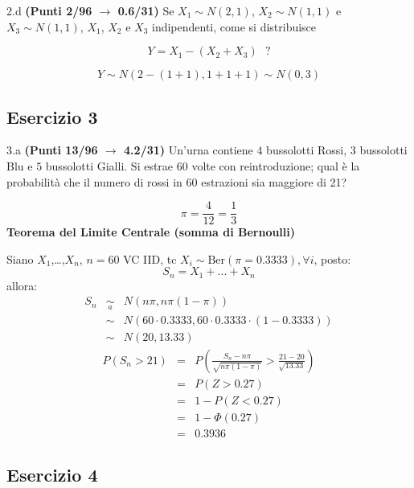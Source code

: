 \documentclass[
  11pt,
]{book}
\theoremstyle{mytheoremstyle}
\theoremstyle{mydefstyle}
\newenvironment{sol}
  {
  \begin{tcolorbox}[enhanced,breakable,arc=0.1mm,boxrule=1pt,colback=white,colframe=iblue,
  title=\bf \fontfamily{lmss}\selectfont \hspace{.5 cm} Soluzione,drop fuzzy shadow]

}{
\end{tcolorbox}
  }
\begin{document}
2.d \textbf{(Punti 2/96 \(\rightarrow\) 0.6/31)} Se \(X_1\sim N(2,1)\), \(X_2\sim N(1,1)\) e \(X_3\sim N(1,1)\),
\(X_1\), \(X_2\) e \(X_3\) indipendenti, come si distribuisce

\[
  Y=X_1-(X_2+X_3) ~~~?
\]

\begin{sol}
\[Y\sim N(2-(1+1),1+1+1)\sim N(0,3)\]

\end{sol}

\subsection{Esercizio 3}\label{esercizio-3-2}

3.a \textbf{(Punti 13/96 \(\rightarrow\) 4.2/31)} Un'urna contiene \(4\) bussolotti Rossi, \(3\) bussolotti Blu e \(5\) bussolotti Gialli. Si estrae 60 volte con reintroduzione; qual è la probabilità che il numero di rossi in 60 estrazioni sia maggiore di 21?

\begin{sol}
\[\pi=\frac 4{12}=\frac 13\]
\textbf{Teorema del Limite Centrale (somma di Bernoulli)}

Siano \(X_1\),\ldots,\(X_n\), \(n=60\) VC IID, tc \(X_i\sim\text{Ber}(\pi=0.3333)\)\(,\forall i\), posto:
\[
      S_n = X_1 + ... + X_n
      \]
allora:\begin{eqnarray*}
  S_n & \mathop{\sim}\limits_{a}& N(n\pi,n\pi(1-\pi)) \\
      &\sim & N(60\cdot0.3333,60\cdot0.3333\cdot(1-0.3333)) \\
      &\sim & N(20,13.33)
  \end{eqnarray*}\begin{eqnarray*}
      P( S_n   >   21 ) 
        &=& P\left(  \frac { S_n  -  n\pi }{ \sqrt{n\pi(1-\pi)} }  >  \frac { 21  -  20 }{\sqrt{ 13.33 }} \right)  \\
                 &=& P\left(  Z   >   0.27 \right) \\    &=& 1-P(Z< 0.27 )\\ 
                 &=&  1-\Phi( 0.27 ) \\ &=&  0.3936 
      \end{eqnarray*}

\end{sol}

\subsection{Esercizio 4}\label{esercizio-4-2}
\end{document}
